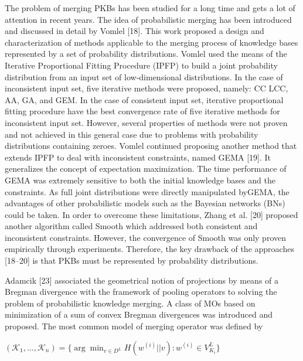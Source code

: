\documentclass[]{iosart2c}
\begin{document}
The problem of merging PKBs has been studied for a long time and gets a lot of attention in recent years. The idea of probabilistic merging has been introduced and discussed in detail by Vomlel [18]. This work proposed a design and characterization of methods applicable to the merging process of knowledge bases represented by a set of probability distributions. Vomlel used the means of the Iterative Proportional Fitting Procedure (IPFP) to build a joint probability distribution from an input set of low-dimensional distributions. In the case of inconsistent input set, five iterative methods were proposed, namely: CC LCC, AA, GA, and GEM. In the case of consistent input set, iterative proportional fitting procedure have the best convergence rate of five iterative methods for inconsistent input set. However, several properties of methods were not proven and not achieved in this general case due to problems with probability distributions containing zeroes. Vomlel continued proposing another method that extends IPFP to deal with inconsistent constraints, named GEMA [19]. It generalizes the concept of expectation maximization. The time performance of GEMA was extremely sensitive to both the initial knowledge bases and the constraints. As full joint distributions were directly manipulated byGEMA, the advantages of other probabilistic models such as the Bayesian networks (BNs) could be taken. In order to overcome these limitations, Zhang et al. [20] proposed another algorithm called Smooth which addressed both consistent and inconsistent constraints. However, the convergence of Smooth was only proven empirically through experiments. Therefore, the key drawback of the approaches [18–20] is that PKBs must be represented by probability distributions. 

Adamcik [23] associated the geometrical notion of projections by means of a Bregman divergence with the framework of pooling operators to solving the problem of probabilistic knowledge merging. A class of MOs based on minimization of a sum of convex  Bregman divergences was introduced and proposed. The most common model of merging operator was defined by

$(\mathcal{K}_1, ... ,\mathcal{K}_n) = \{ \arg \min_{v \in D^L} H(w^{(i)}||v) : w^{(i)} \in V^L_{K_i}\}$
\end{document}

